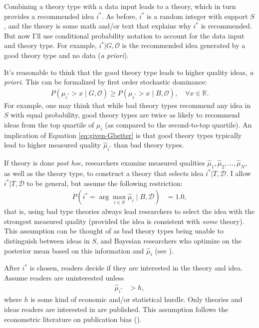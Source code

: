 \documentclass[12pt,english]{article}
\theoremstyle{plain}
\theoremstyle{plain}
\begin{document}
Combining a theory type with a data input leads to a theory, which in turn provides a recommended idea $i^{\ast}$. As before, $i^\ast$ is a random integer with support $S$, and the theory is some math and/or text that explains why $i^\ast$ is recommended.  But now I'll use conditional probability notation to account for the data input and theory type. For example, $i^{\ast}|G,\mathcal{O}$ is the recommended idea generated by a good theory type and no data (\emph{a priori}).

It's reasonable to think that the good theory type leads to higher quality ideas, \emph{a priori}. This can be formalized by first order stochastic dominance:
\begin{align}
P\left(\mu_{i^{\ast}}>x\mid G,\mathcal{O}\right)
\geq
P\left(\mu_{i^{\ast}}>x\mid B,\mathcal{O}\right),
\quad \forall x\in \mathbb{R}.
\label{eq:given-Gbetter}
\end{align}
For example, one may think that while bad theory types recommend any idea in $S$ with equal probability, good theory types are twice as likely to recommend ideas from the top quartile of $\mu_{i}$ (as compared to the second-to-top quartile). An implication of Equation \eqref{eq:given-Gbetter} is that  good theory types typically lead to higher measured quality $\hat{\mu}_{i^{\ast}}$ than bad theory types.

If theory is done \emph{post hoc}, researchers examine measured qualities $\hat{\mu}_1,\hat{\mu}_2,...,\hat{\mu}_N$, as well as the theory type, to construct a theory that selects idea $i^{\ast}|T,\mathcal{D}$. I allow $i^{\ast}|T,\mathcal{D}$ to be general, but assume the following restriction:
\begin{align}
P\left(i^{\ast}=\arg\max_{i\in S }\hat{\mu}_{i}\mid B,\mathcal{D}\right) & =1.0,
\label{eq:endo:bad-post-hoc}
\end{align}
that is, using bad type theories always lead researchers to select the idea with the strongest measured quality (provided the idea is consistent with \emph{some} theory).  This assumption can be thought of as bad theory types being unable to distinguish between ideas in $S$, and Bayesian researchers who optimize on the posterior mean based on this information and $\hat{\mu}_{i}$ (see \citealt{chen2025high}). 

After $i^{\ast}$ is chosen, readers decide if they are interested in the theory and idea. Assume readers are uninterested unless 
\begin{align}\label{eq:hurdle}
\hat{\mu}_{i^{\ast}} & >h,
\end{align}
where $h$ is some kind of economic and/or statistical hurdle. Only theories and ideas readers are interested in are published. This assumption follows the econometric literature on publication bias (\citet{andrews2019identification}).
\end{document}
